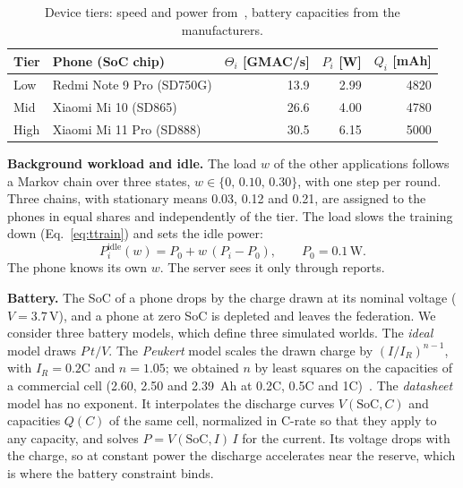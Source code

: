 \begin{table}[t]
\centering
\caption{Device tiers: speed and power from~\cite{xu2022mandheling}, battery
capacities from the manufacturers.}
\label{tab:tiers}
\footnotesize
\setlength{\tabcolsep}{4pt}
\begin{tabular}{llrrr}
\hline
Tier & Phone (SoC chip) & $\Theta_i$ [GMAC/s] & $P_i$ [W] & $Q_i$ [mAh] \\
\hline
Low  & Redmi Note 9 Pro (SD750G) & 13.9 & 2.99 & 4820 \\
Mid  & Xiaomi Mi 10 (SD865)      & 26.6 & 4.00 & 4780 \\
High & Xiaomi Mi 11 Pro (SD888)  & 30.5 & 6.15 & 5000 \\
\hline
\end{tabular}
\end{table}

\textbf{Background workload and idle.}
The load $w$ of the other applications follows a Markov chain over three
states, $w\in\{0,\,0.10,\,0.30\}$, with one step per round. Three chains, with
stationary means 0.03, 0.12 and 0.21, are assigned to the phones in equal
shares and independently of the tier. The load slows the training down
(Eq.~\eqref{eq:ttrain}) and sets the idle power:
\begin{equation}
  P^{\mathrm{idle}}_i(w) = P_0 + w\,(P_i - P_0), \qquad P_0=0.1\,\mathrm{W}.
  \label{eq:idle}
\end{equation}
The phone knows its own $w$. The server sees it only through reports.

\textbf{Battery.}
The SoC of a phone drops by the charge drawn at its nominal voltage
($V=3.7\,\mathrm{V}$), and a phone at zero SoC is depleted and leaves the
federation. We consider three battery models, which define three simulated
worlds. The \emph{ideal} model draws $P\,t/V$. The \emph{Peukert} model scales
the drawn charge by $(I/I_R)^{n-1}$, with $I_R=0.2$C and $n=1.05$; we
obtained $n$ by least squares on the capacities of a commercial cell (2.60,
2.50 and 2.39~Ah at 0.2C, 0.5C and 1C)~\cite{doerffel2006peukert}. The
\emph{datasheet} model has no exponent. It interpolates the discharge curves
$V(\mathrm{SoC},C)$ and capacities $Q(C)$ of the same cell, normalized in
C-rate so that they apply to any capacity, and solves $P=V(\mathrm{SoC},I)\,I$
for the current. Its voltage drops with the charge, so at constant power the
discharge accelerates near the reserve, which is where the battery constraint
binds. 

